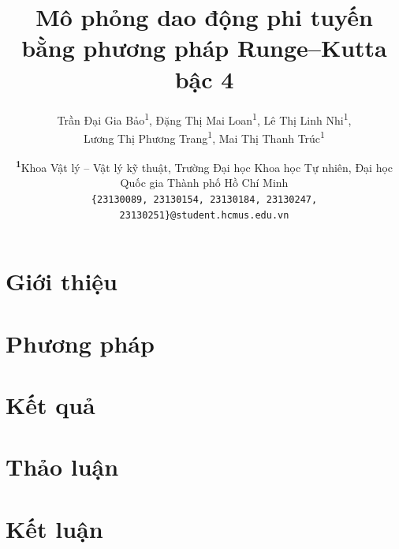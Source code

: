 \documentclass[
	a4paper,
	10pt,
	unnumberedsections,
	twoside,
]{LTJournalArticle}
\title{Mô phỏng dao động phi tuyến\\
  bằng phương pháp Runge--Kutta bậc 4}
\author{
	Trần Đại Gia Bảo\textsuperscript{1},
  Đặng Thị Mai Loan\textsuperscript{1},
  Lê Thị Linh Nhi\textsuperscript{1},\\
  Lương Thị Phương Trang\textsuperscript{1},
  Mai Thị Thanh Trúc\textsuperscript{1}
}
\date{\footnotesize\textsuperscript{\textbf{1}}Khoa Vật lý -- Vật lý kỹ thuật, Trường Đại học Khoa học Tự nhiên, Đại học Quốc gia Thành phố Hồ Chí Minh\\
\texttt{\{23130089, 23130154, 23130184, 23130247, 23130251\}@student.hcmus.edu.vn}
}
\begin{document}
\maketitle


\section{Giới thiệu}



\section{Phương pháp}


\section{Kết quả}



\section{Thảo luận}



\section{Kết luận}



\nocite{*}
\printbibliography

\end{document}

